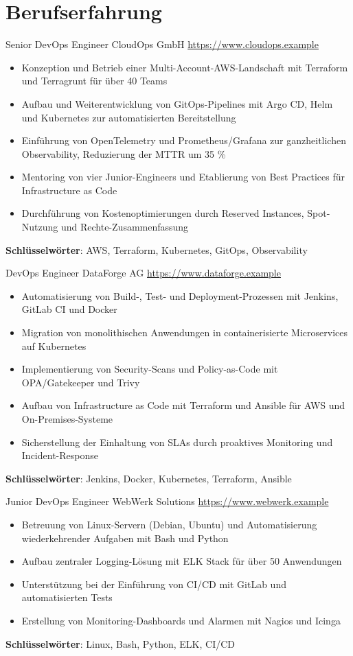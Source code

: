 \documentclass[a4paper, serif, 10pt]{moderncv}
\begin{document}
\section{Berufserfahrung}

        {Senior DevOps Engineer}
        {CloudOps GmbH}
        {\url{https://www.cloudops.example}}
        {}
        {\begin{itemize}
\item Konzeption und Betrieb einer Multi-Account-AWS-Landschaft mit Terraform und Terragrunt für über 40 Teams
\item Aufbau und Weiterentwicklung von GitOps-Pipelines mit Argo CD, Helm und Kubernetes zur automatisierten Bereitstellung
\item Einführung von OpenTelemetry und Prometheus/Grafana zur ganzheitlichen Observability, Reduzierung der MTTR um 35 \%
\item Mentoring von vier Junior-Engineers und Etablierung von Best Practices für Infrastructure as Code
\item Durchführung von Kostenoptimierungen durch Reserved Instances, Spot-Nutzung und Rechte-Zusammenfassung
\end{itemize}
\textbf{Schlüsselwörter}: AWS, Terraform, Kubernetes, GitOps, Observability}

        {DevOps Engineer}
        {DataForge AG}
        {\url{https://www.dataforge.example}}
        {}
        {\begin{itemize}
\item Automatisierung von Build-, Test- und Deployment-Prozessen mit Jenkins, GitLab CI und Docker
\item Migration von monolithischen Anwendungen in containerisierte Microservices auf Kubernetes
\item Implementierung von Security-Scans und Policy-as-Code mit OPA/Gatekeeper und Trivy
\item Aufbau von Infrastructure as Code mit Terraform und Ansible für AWS und On-Premises-Systeme
\item Sicherstellung der Einhaltung von SLAs durch proaktives Monitoring und Incident-Response
\end{itemize}
\textbf{Schlüsselwörter}: Jenkins, Docker, Kubernetes, Terraform, Ansible}

        {Junior DevOps Engineer}
        {WebWerk Solutions}
        {\url{https://www.webwerk.example}}
        {}
        {\begin{itemize}
\item Betreuung von Linux-Servern (Debian, Ubuntu) und Automatisierung wiederkehrender Aufgaben mit Bash und Python
\item Aufbau zentraler Logging-Lösung mit ELK Stack für über 50 Anwendungen
\item Unterstützung bei der Einführung von CI/CD mit GitLab und automatisierten Tests
\item Erstellung von Monitoring-Dashboards und Alarmen mit Nagios und Icinga
\end{itemize}
\textbf{Schlüsselwörter}: Linux, Bash, Python, ELK, CI/CD}
\end{document}
